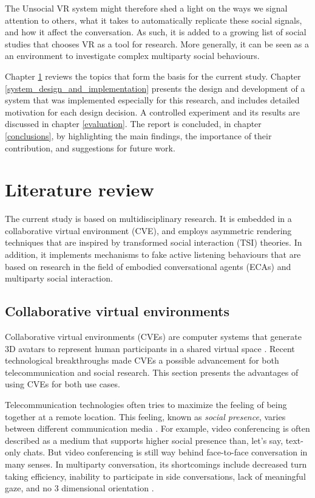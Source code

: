 \documentclass[]{simple-thesis}
\begin{document}
The Unsocial VR system might therefore shed a light on the ways we signal attention to others, what it takes to automatically replicate these social signals, and how it affect the conversation.
As such, it is added to a growing list of social studies that chooses VR as a tool for research.
More generally, it can be seen as a an environment to investigate complex multiparty social behaviours.

Chapter \ref{literature_review} reviews the topics that form the basis for the current study.
Chapter \ref{system_design_and_implementation} presents the design and development of a system that was implemented especially for this research, and includes detailed motivation for each design decision.
A controlled experiment and its results are discussed in chapter \ref{evaluation}.
The report is concluded, in chapter \ref{conclusions}, by highlighting the main findings, the importance of their contribution, and suggestions for future work.


\chapter{Literature review}\label{literature_review}

The current study is based on multidisciplinary research.
It is embedded in a collaborative virtual environment (CVE), and employs asymmetric rendering techniques that are inspired by transformed social interaction (TSI) theories.
In addition, it implements mechanisms to fake active listening behaviours that are based on research in the field of embodied conversational agents (ECAs) and multiparty social interaction.

\section{Collaborative virtual environments}

Collaborative virtual environments (CVEs) are computer systems that generate 3D avatars to represent human participants in a shared virtual space \citep{Bailenson2004}.
Recent technological breakthroughs made CVEs a possible advancement for both telecommunication and social research.
This section presents the advantages of using CVEs for both use cases.

Telecommunication technologies often tries to maximize the feeling of being together at a remote location.
This feeling, known as \textit{social presence}, varies between different communication media \citep{Short1976}.
For example, video conferencing is often described as a medium that supports higher social presence than, let's say, text-only chats.
But video conferencing is still way behind face-to-face conversation in many senses.
In multiparty conversation, its shortcomings include decreased turn taking efficiency, inability to participate in side conversations, lack of meaningful gaze, and no 3 dimensional orientation \citep{Isaacs1994}.
\end{document}

